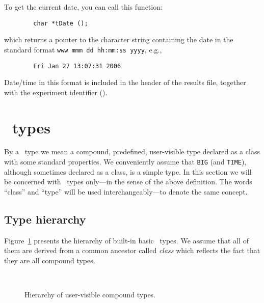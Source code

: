 \medskip


To get the current date, you can call this function:
\begin{verbatim}
        char *tDate ();
\end{verbatim}
which returns a pointer to the character string containing the date in the
standard format {\tt www\ mmm\ dd\ hh:mm:ss\ yyyy}, e.g.,
\begin{verbatim}
        Fri Jan 27 13:07:31 2006
\end{verbatim}

Date/time in this format is included in the header of the results
file, together with the experiment identifier ().

\section{\smurph\ types}
\label{rm_st}

By a \smurph\ type we mean a compound, predefined, user-visible
type declared as a class with some standard properties.
We conveniently assume that {\tt BIG} (and {\tt TIME}), although sometimes
declared as a class, is a simple type.
In this section we will be concerned with \smurph\ types only---in the sense of
the above definition.
The words ``class'' and ``type'' will be used interchangeably---to
denote the same concept.

\subsection{Type hierarchy}
\label{rm_st_th}

Figure~\ref{ty_hi}
presents the hierarchy of built-in basic \smurph\ types.
We assume that all of them are derived from a common ancestor called
{\em class} which reflects the fact that they are all compound types.

\begin{figure}
\begin{center}
\ 
\caption{Hierarchy of user-visible compound types.}%
\label{ty_hi}
\end{center}
\end{figure}

